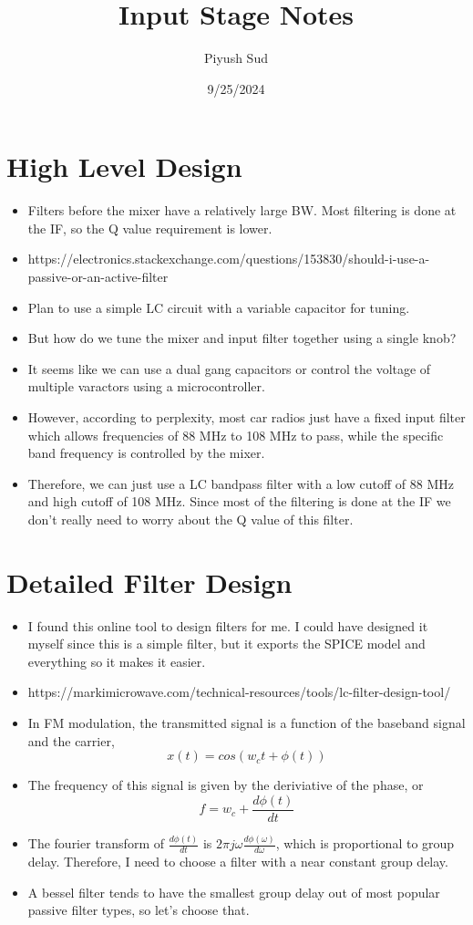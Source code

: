 \documentclass[12pt, letterpaper]{article}
\title{Input Stage Notes}
\author{Piyush Sud}
\date{9/25/2024}
\begin{document}
\maketitle

\pagebreak

\section{High Level Design}
\begin{itemize}
    \item Filters before the mixer have a relatively large BW. Most filtering is done at the IF, so the Q value requirement is lower.
    \item https://electronics.stackexchange.com/questions/153830/should-i-use-a-passive-or-an-active-filter
    \item Plan to use a simple LC circuit with a variable capacitor for tuning.
    \item But how do we tune the mixer and input filter together using a single knob?
    \item It seems like we can use a dual gang capacitors or control the voltage of multiple varactors using a microcontroller.
    \item However, according to perplexity, most car radios just have a fixed input filter which allows frequencies of 88 MHz to 108 MHz to pass, while the specific band frequency is controlled by the mixer.
    \item Therefore, we can just use a LC bandpass filter with a low cutoff of 88 MHz and high cutoff of 108 MHz. Since most of the filtering is done at the IF we don't really need to worry about the Q value of this filter.
\end{itemize}

\section{Detailed Filter Design}
\begin{itemize}
    \item I found this online tool to design filters for me. I could have designed it myself since this is a simple filter, but it exports the SPICE model and everything so it makes it easier.
    \item https://markimicrowave.com/technical-resources/tools/lc-filter-design-tool/
    \item In FM modulation, the transmitted signal is a function of the baseband signal and the carrier,
    \[
        x(t) = cos(w_ct + \phi(t))
    \]
    \item The frequency of this signal is given by the deriviative of the phase, or 
    \[
        f = w_c + \frac{d\phi(t)}{dt}
    \]
    \item The fourier transform of \(\frac{d\phi(t)}{dt}\) is \(2 \pi j\omega\frac{d\phi(\omega)}{d\omega}\), which is proportional to group delay. Therefore, I need to choose a filter with a near constant group delay. 
    \item A bessel filter tends to have the smallest group delay out of most popular passive filter types, so let's choose that.
\end{itemize}
\end{document}
